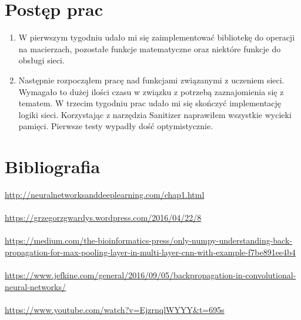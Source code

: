 \documentclass[11pt, a4paper]{article}
\begin{document}
\section{Postęp prac}
\begin{enumerate}

\item W pierwszym tygodniu udało mi się zaimplementować bibliotekę do operacji na macierzach, pozostałe funkcje matematyczne oraz niektóre funkcje do obsługi sieci.

\item Następnie rozpocząłem pracę nad funkcjami związanymi z uczeniem sieci. Wymagało to dużej ilości czasu w związku z potrzebą zaznajomienia się z tematem. W trzecim tygodniu prac udało mi się skończyć implementację logiki sieci. Korzystając z narzędzia Sanitizer naprawiłem wszystkie wycieki pamięci. Pierwsze testy wypadły dość optymistycznie.  

\end{enumerate}

\section{Bibliografia}
\url{http://neuralnetworksanddeeplearning.com/chap1.html}\\\\
\url{https://grzegorzgwardys.wordpress.com/2016/04/22/8}\\\\
\url{https://medium.com/the-bioinformatics-press/only-numpy-understanding-back-propagation-for-max-pooling-layer-in-multi-layer-cnn-with-example-f7be891ee4b4}\\\\
\url{https://www.jefkine.com/general/2016/09/05/backpropagation-in-convolutional-neural-networks/}\\\\
\url{https://www.youtube.com/watch?v=EjzrnqlWYYY&t=695s}
\end{document}
